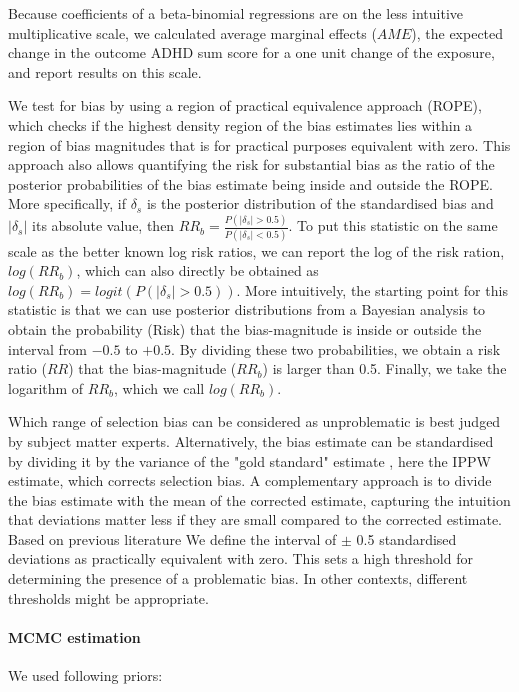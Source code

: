 \documentclass[12pt]{article}
\begin{document}
Because coefficients of a beta-binomial regressions are on the less intuitive multiplicative scale, we calculated average marginal effects ($AME$), the expected change in the outcome ADHD sum score for a one unit change of the exposure, and report results on this scale.

We test for bias by using a region of practical equivalence approach (ROPE)\cite{Kruschke2010-zi}, which checks if the highest density region of the bias estimates lies within a region of bias magnitudes that is for practical purposes equivalent with zero. This approach also allows quantifying the risk for substantial bias as the ratio of the posterior probabilities of the bias estimate being inside and outside the ROPE. More specifically, if $\delta_s$ is the posterior distribution of the standardised bias and $|\delta_s|$ its absolute value, then $RR_b =  \frac{P(|\delta_s|>0.5)}{P(|\delta_s|<0.5)}$. To put this statistic on the same scale as the better known log risk ratios, we can report the log of the risk ration, $log(RR_b)$, which can also directly be obtained as  $log(RR_b) = logit(P(|\delta_s|>0.5))$. 
More intuitively, the starting point for this statistic is that we can use posterior distributions from a Bayesian analysis to obtain the probability (Risk) that the bias-magnitude is inside or outside the interval from $-0.5$ to $+0.5$. By dividing these two probabilities, we obtain a risk ratio ($RR$) that the bias-magnitude ($RR_b$) is larger than 0.5. Finally, we take the logarithm of $RR_b$, which we call $log(RR_b)$. 

Which range of selection bias can be considered as unproblematic is best judged by subject matter experts. Alternatively, the bias estimate can be standardised by dividing it by the variance of the "gold standard" estimate \cite{Austin2009-xk}, here the IPPW estimate, which corrects selection bias. A complementary approach is to divide the bias estimate with the mean of the corrected estimate, capturing the intuition that deviations matter less if they are small compared to the corrected estimate. Based on previous literature \cite{Nilsen2009-ci, Austin2009-xk} We define the interval of $\pm$ 0.5 standardised deviations as practically equivalent with zero. This sets a high threshold for determining the presence of a problematic bias. In other contexts, different thresholds might be appropriate.

\paragraph{MCMC estimation} 
We used following priors:
\end{document}
